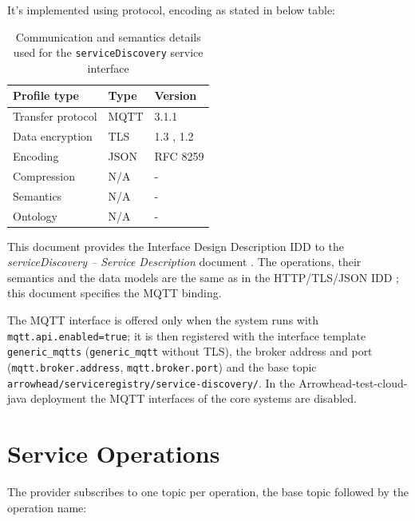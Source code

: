 \documentclass[a4paper]{arrowhead}
\begin{document}
It's implemented using protocol, encoding as stated in below table:
\begin{table}[ht!]
  \centering
  \begin{tabular}{|l|l|l|}
    \hline
    \rowcolor{gray!33} Profile type & Type & Version \\ \hline
    Transfer protocol & MQTT & 3.1.1 \cite{mqtt311} \\ \hline
    Data encryption & TLS & 1.3 \cite{rfc8446}, 1.2 \cite{rfc5246} \\ \hline
    Encoding & JSON & RFC 8259 \cite{rfc8259} \\ \hline
    Compression & N/A & - \\ \hline
    Semantics & N/A & - \\ \hline
    Ontology & N/A & - \\ \hline
  \end{tabular}
  \caption{Communication and semantics details used for the \texttt{serviceDiscovery} service interface}
  \label{tab:comunication_semantics_profile}
\end{table}

This document provides the Interface Design Description IDD to the \textit{serviceDiscovery -- Service Description} document \cite{sr-serviceDiscovery-sd}.
The operations, their semantics and the data models are the same as in the HTTP/TLS/JSON IDD \cite{sr-serviceDiscovery-http-idd}; this document specifies the MQTT binding.

The MQTT interface is offered only when the system runs with \texttt{mqtt.api.enabled=true}; it is then registered with the interface template \texttt{generic\_\allowbreak{}mqtts} (\texttt{generic\_\allowbreak{}mqtt} without TLS), the broker address and port (\texttt{mqtt.\allowbreak{}broker.\allowbreak{}address}, \texttt{mqtt.\allowbreak{}broker.\allowbreak{}port}) and the base topic \texttt{arrowhead/\allowbreak{}serviceregistry/\allowbreak{}service-\allowbreak{}discovery/\allowbreak{}}. In the Arrowhead-test-cloud-java deployment the MQTT interfaces of the core systems are disabled.

\newpage

\section{Service Operations}
\label{sec:operations}

The provider subscribes to one topic per operation, the base topic followed by the operation name:
\end{document}
